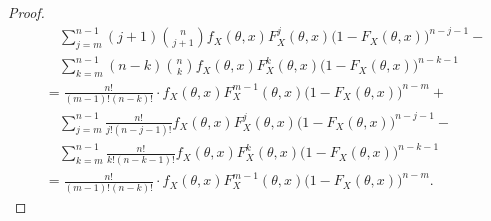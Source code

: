 \begin{proof}
{\begin{equation*}
\begin{split}
&\quad \sum_{j=m}^{n-1} (j+1)\binom{n}{j+1} f_{X}(\theta,x) F_X^{j}(\theta,x) \big(1-F_X(\theta,x)\big)^{n-j-1}- \\
& \quad \sum_{k=m}^{n-1} (n-k)\binom{n}{k} f_{X}(\theta,x) F_X^{k}(\theta,x)\big(1-F_X(\theta,x)\big)^{n-k-1} \\
&=\frac{n!}{(m-1)!(n-k)!}\cdot f_{X}(\theta,x)F_X^{m-1}(\theta,x) \big(1-F_X(\theta,x)\big)^{n-m} + \\
&\quad \sum_{j=m}^{n-1} \frac{n!}{j!(n-j-1)!} f_{X}(\theta,x) F_X^{j}(\theta,x) \big(1-F_X(\theta,x)\big)^{n-j-1}- \\
& \quad \sum_{k=m}^{n-1} \frac{n!}{k!(n-k-1)!} f_{X}(\theta,x) F_X^{k}(\theta,x)\big(1-F_X(\theta,x)\big)^{n-k-1} \\
&=\frac{n!}{(m-1)!(n-k)!}\cdot f_{X}(\theta,x)F_X^{m-1}(\theta,x) \big(1-F_X(\theta,x)\big)^{n-m}.
\end{split}\end{equation*}
}
\end{proof}
